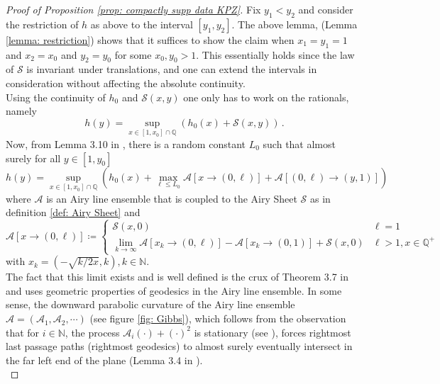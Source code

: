 \documentclass[12pt]{report}
\theoremstyle{plain}
\newcommand{\N}{\ensuremath{\mathbb{N}}}
\newcommand{\Q}{\ensuremath{\mathbb{Q}}}
\begin{document}
\begin{proof}[Proof of Proposition \ref{prop: compactly supp data KPZ}]
    Fix $y_1<y_2$ and consider the restriction of $h$ as above to the interval $[y_1,y_2]$. The above lemma, (Lemma \ref{lemma: restriction}) shows that it suffices to show the claim when $x_1 = y_1 = 1$ and $x_2=x_0$ and $y_2 = y_0$ for some $x_0,y_0>1$. This essentially holds since the law of $\mathcal{S}$ is invariant under translations, and one can extend the intervals in consideration without affecting the absolute continuity.\\

    Using the continuity of $h_0$ and $\mathcal{S}(x,y)$ one only has to work on the rationals, namely
    \[
    h(y) = \sup_{x\in[1,x_0]\cap\Q}(h_0(x)+\mathcal{S}(x,y))\,.
    \]
    Now, from Lemma 3.10 in \cite{sarkar2021brownian}, there is a random constant $L_0$ such that almost surely for all $y\in[1,y_0]$
    \[
    h(y) = \sup_{x\in[1,x_0]\cap\Q}(h_0(x)+\max_{\ell\leq L_0}\mathcal{A}[x\to(0,\ell)]+\mathcal{A}[(0,\ell)\to (y,1)])
    \]
    where $\mathcal{A}$ is an Airy line ensemble that is coupled to the Airy Sheet $\mathcal {S}$ as in definition \ref{def: Airy Sheet} and 
    \begin{equation}\label{eq:Airy limit}
    \mathcal{A}[x\to(0,\ell)]\coloneqq 
    \begin{cases}
        \mathcal{S}(x,0) & \ell = 1\\
        \displaystyle\lim_{k\to\infty}\mathcal{A}[x_k\to (0,\ell)]-\mathcal{A}[x_k\to (0,1)]+\mathcal{S}(x,0) & \ell >1, x\in\Q^+
    \end{cases}
    \end{equation}
    with $x_k = (-\sqrt{k/2x},k), k\in\N$.\\
    
    \noindent The fact that this limit exists and is well defined is the crux of Theorem 3.7 in \cite{sarkar2021brownian} and uses geometric properties of geodesics in the Airy line ensemble. In some sense, the downward parabolic curvature of the Airy line ensemble $\mathbf{\mathcal{A}} = (\mathcal{A}_1, \mathcal{A}_2,\cdots)$ (see figure \ref{fig: Gibbs}), which follows from the observation that for $i\in \N$, the process $\mathcal{A}_i(\cdot)+(\cdot)^2$ is stationary (see \cite{sarkar2021brownian}), forces rightmost last passage paths (rightmost geodesics) to almost surely eventually intersect in the far left end of the plane (Lemma 3.4 in \cite{sarkar2021brownian}).\\
    

\end{proof}
\end{document}
